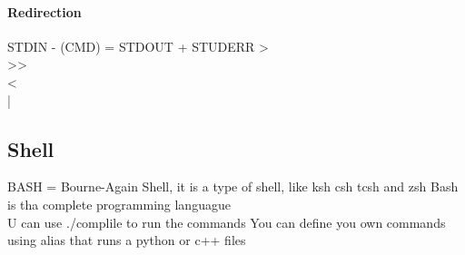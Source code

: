 \documentclass[12pt,a4paper]{article}
\begin{document}
\paragraph{Redirection}
    STDIN - (CMD) = STDOUT + STUDERR
    >\\
    >>\\
    <\\
    |\\

\subsection{Shell}
BASH = Bourne-Again Shell, it is a type of shell, like ksh csh tcsh and zsh
Bash is tha complete programming languague\\
U can use ./complile to run the commands
You can define you own commands using alias that runs a python or c++ files
\end{document}
